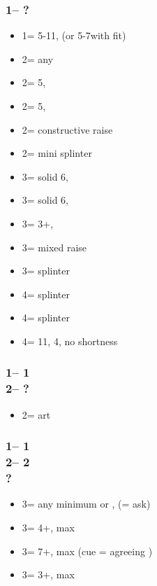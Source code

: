 \documentclass[12pt, a4paper]{article}
\begin{document}
\subsubsection*{1\spades -- ?}
\begin{itemize}
    \item 1\nt = 5-11\hcp, (or 5-7\hcp with \spades fit)
    \item 2\clubs = any \gf
    \item 2\diams = 5\diams, \gf
    \item 2\hearts = 5\hearts, \gf
    \item 2\spades = constructive raise
    \item 2\nt = mini splinter
    \item 3\clubs = solid 6\clubs, \inv
    \item 3\diams = solid 6\diams, \inv
    \item 3\hearts = 3+\spades, \inv
    \item 3\spades = mixed raise
    \item 3\nt = splinter \hearts
    \item 4\clubs = splinter \clubs
    \item 4\diams = splinter \diams
    \item 4\hearts = 11\hcp, 4\spades, no shortness
\end{itemize}

\subsubsection*{1\hearts -- 1\spades\\
                2\hearts -- ?}
\begin{itemize}
    \item 2\nt = \invp art \vimp
\end{itemize}

\subsubsection*{1\hearts -- 1\spades\\
                2\hearts -- 2\nt\\
                ?}
\begin{itemize}
    \item 3\clubs = any minimum or \nat, \forc (\diams = ask) \vimp
    \item 3\diams = 4+\diams, max
    \item 3\hearts = 7+\hearts, max (cue = agreeing \hearts)
    \item 3\spades = 3+\spades, max
\end{itemize}
\end{document}
